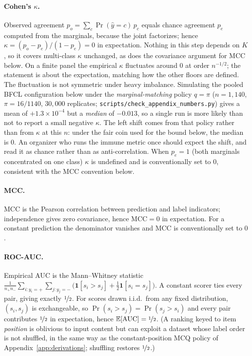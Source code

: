 \documentclass{article}
\theoremstyle{plain}
\theoremstyle{definition}
\begin{document}
\paragraph{Cohen's $\kappa$.}
Observed agreement $p_o = \sum_c \Pr(\hat{y}=c)\,p_c$ equals chance agreement $p_e$ computed from the marginals, because the joint factorizes; hence $\kappa = (p_o - p_e)/(1 - p_e) = 0$ in expectation. Nothing in this step depends on $K$, so it covers multi-class $\kappa$ unchanged, as does the covariance argument for MCC below. On a finite panel the empirical $\kappa$ fluctuates around $0$ at order $n^{-1/2}$; the statement is about the expectation, matching how the other floors are defined. The fluctuation is not symmetric under heavy imbalance. Simulating the pooled BFCL configuration below under the \emph{marginal-matching} policy $q = \pi$ ($n = 1{,}140$, $\pi = 16/1140$, $30{,}000$ replicates; \texttt{scripts/check\_appendix\_numbers.py}) gives a mean of $+1.3\times10^{-4}$ but a \emph{median} of $-0.013$, so a single run is more likely than not to report a small negative $\kappa$. The left shift comes from that policy rather than from $\kappa$ at this $n$: under the fair coin used for the bound below, the median is $0$. An organizer who runs the immune metric once should expect the shift, and read it as chance rather than as anti-correlation. When $p_e = 1$ (both marginals concentrated on one class) $\kappa$ is undefined and is conventionally set to $0$, consistent with the MCC convention below.

\paragraph{MCC.}
MCC is the Pearson correlation between prediction and label indicators; independence gives zero covariance, hence $\mathrm{MCC} = 0$ in expectation. For a constant prediction the denominator vanishes and MCC is conventionally set to $0$ \citep{chicco2020advantages}.

\paragraph{ROC-AUC.}
Empirical AUC is the Mann--Whitney statistic
$\frac{1}{n_+ n_-}\sum_{i: y_i = +}\sum_{j: y_j = -}\bigl(\mathbf{1}[s_i > s_j] + \tfrac12\mathbf{1}[s_i = s_j]\bigr)$.
A constant scorer ties every pair, giving exactly $\nicefrac{1}{2}$. For scores drawn i.i.d.\ from any fixed distribution, $(s_i, s_j)$ is exchangeable, so $\Pr(s_i > s_j) = \Pr(s_j > s_i)$ and every pair contributes $\nicefrac{1}{2}$ in expectation, hence $\mathbb{E}[\mathrm{AUC}] = \nicefrac{1}{2}$. (A ranking keyed to item \emph{position} is oblivious to input content but can exploit a dataset whose label order is not shuffled, in the same way as the constant-position MCQ policy of Appendix~\ref{app:derivations}; shuffling restores $\nicefrac{1}{2}$.)
\end{document}
